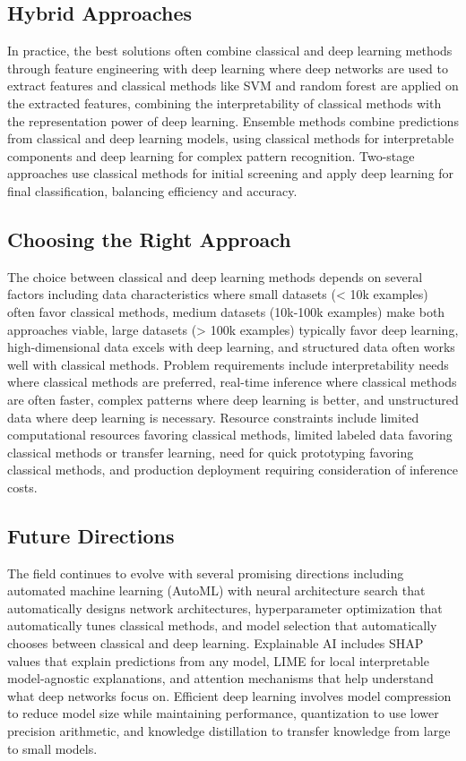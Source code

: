 \subsection{Hybrid Approaches}

In practice, the best solutions often combine classical and deep learning methods through feature engineering with deep learning where deep networks are used to extract features and classical methods like SVM and random forest are applied on the extracted features, combining the interpretability of classical methods with the representation power of deep learning. Ensemble methods combine predictions from classical and deep learning models, using classical methods for interpretable components and deep learning for complex pattern recognition. Two-stage approaches use classical methods for initial screening and apply deep learning for final classification, balancing efficiency and accuracy.

\subsection{Choosing the Right Approach}

The choice between classical and deep learning methods depends on several factors including data characteristics where small datasets (< 10k examples) often favor classical methods, medium datasets (10k-100k examples) make both approaches viable, large datasets (> 100k examples) typically favor deep learning, high-dimensional data excels with deep learning, and structured data often works well with classical methods. Problem requirements include interpretability needs where classical methods are preferred, real-time inference where classical methods are often faster, complex patterns where deep learning is better, and unstructured data where deep learning is necessary. Resource constraints include limited computational resources favoring classical methods, limited labeled data favoring classical methods or transfer learning, need for quick prototyping favoring classical methods, and production deployment requiring consideration of inference costs.

\subsection{Future Directions}

The field continues to evolve with several promising directions including automated machine learning (AutoML) with neural architecture search that automatically designs network architectures, hyperparameter optimization that automatically tunes classical methods, and model selection that automatically chooses between classical and deep learning. Explainable AI includes SHAP values that explain predictions from any model, LIME for local interpretable model-agnostic explanations, and attention mechanisms that help understand what deep networks focus on. Efficient deep learning involves model compression to reduce model size while maintaining performance, quantization to use lower precision arithmetic, and knowledge distillation to transfer knowledge from large to small models.


